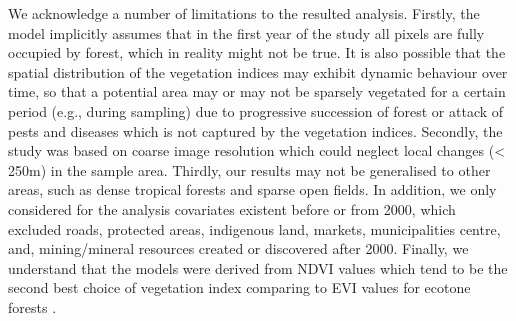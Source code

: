 We acknowledge a number of limitations to the resulted analysis. Firstly, the model implicitly assumes that in the first year of the study all pixels are fully occupied by forest, which in reality might not be true. It is also possible that the spatial distribution of the vegetation indices may exhibit dynamic behaviour over time, so that a potential area may or may not be sparsely vegetated for a certain period (e.g., during sampling) due to progressive succession of forest or attack of pests and diseases which is not captured by the vegetation indices. Secondly, the study was based on coarse image resolution which could neglect local changes (< 250m) in the sample area. Thirdly, our results may not be generalised to other areas, such as dense tropical forests and sparse open fields. In addition, we only considered for the analysis covariates existent before or from 2000, which excluded roads, protected areas, indigenous land, markets, municipalities centre, and, mining/mineral resources created or discovered after 2000. Finally, we understand that the models were derived from NDVI values which tend to be the second best choice of vegetation index comparing to EVI values for ecotone forests \citep{ratana_huete_ferreira_2005,bayma_sano_2015,didan_munoz_2015}.
 